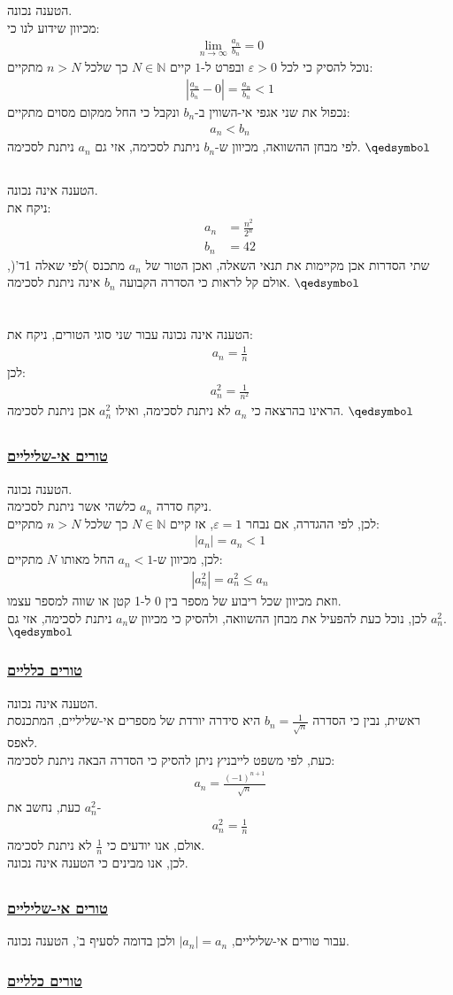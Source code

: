 \documentclass[a4paper, 12pt, leqno]{article}
\newcommand{\sub}[1]{\subsection{\underline{#1}}}
\newcommand{\subsub}[1]{\subsubsection{\underline{#1}}}
\newcommand{\N}{\ensuremath{\mathbb{N}}}
\newcommand{\eq}[1]{\begin{align*}#1\end{align*}}
\newcommand{\limn}{\lim_{n\to\infty}}
\renewcommand{\qed}{\hfill\(\qedsymbol\)}
\renewcommand{\leq}{\leqslant}
\begin{document}
\pagebreak
\section{}
\sub{}
הטענה נכונה.\\
מכיוון שידוע לנו כי:
\eq{
    \limn\frac{a_n}{b_n}=0
}
נוכל להסיק כי לכל $\varepsilon>0$ ובפרט ל-$1$ קיים $N\in\N$ כך שלכל $n>N$ מתקיים:
\eq{
    |\frac{a_n}{b_n}-0|=\frac{a_n}{b_n}<1
}
נכפול את שני אגפי אי-השווין ב-$b_n$ ונקבל כי החל ממקום מסוים מתקיים:
\eq{
    a_n<b_n
}
לפי מבחן ההשוואה, מכיוון ש-$b_n$ ניתנת לסכימה, אזי גם $a_n$ ניתנת לסכימה.
\qed
\sub{}
הטענה אינה נכונה.\\
ניקח את:
\eq{
    a_n&=\frac{n^2}{2^n}\\
    b_n&=42
}
שתי הסדרות אכן מקיימות את תנאי השאלה, ואכן הטור של $a_n$ מתכנס )לפי שאלה 1ד'(, אולם קל לראות כי הסדרה הקבועה $b_n$ אינה ניתנת לסכימה.
\qed\pagebreak

\section{}
\sub{}
הטענה אינה נכונה עבור שני סוגי הטורים, ניקח את:
\eq{
    a_n=\frac{1}{n}
}
לכן:
\eq{
    a^{2}_{n}=\frac{1}{n^2}
}
הראינו בהרצאה כי $a_n$ לא ניתנת לסכימה, ואילו $a^{2}_{n}$ אכן ניתנת לסכימה.
\qed
\sub{}
\subsub{טורים אי-שליליים}
הטענה נכונה.\\
ניקח סדרה $a_n$ כלשהי אשר ניתנת לסכימה.\\
לכן, לפי ההגדרה, אם נבחר $\varepsilon=1$, אז קיים $N\in\N$ כך שלכל $n>N$ מתקיים:
\eq{
    |a_n|=a_n<1
}
לכן, מכיוון ש-$a_n<1$ החל מאותו $N$ מתקיים:
\eq{
    |a^{2}_{n}|=a^{2}_{n}\leq{a_n}
}
וזאת מכיוון שכל ריבוע של מספר בין 0 ל-1 קטן או שווה למספר עצמו.\\
לכן, נוכל כעת להפעיל את מבחן ההשוואה, ולהסיק כי מכיוון ש$a_n$ ניתנת לסכימה, אזי גם $a^{2}_{n}$.
\qed
\subsub{טורים כלליים}
הטענה אינה נכונה.\\
ראשית, נבין כי הסדרה $b_n=\frac{1}{\sqrt{n}}$ היא סידרה יורדת של מספרים אי-שליליים, המתכנסת לאפס.\\
כעת, לפי משפט לייבניץ ניתן להסיק כי הסדרה הבאה ניתנת לסכימה:
\eq{
    a_n=\frac{(-1)^{n+1}}{\sqrt{n}}
}
כעת, נחשב את $a^{2}_{n}$-
\eq{
    a^{2}_{n}=\frac{1}{n}
}
אולם, אנו יודעים כי $\frac{1}{n}$ לא ניתנת לסכימה.\\
לכן, אנו מבינים כי הטענה אינה נכונה.
\sub{}
\subsub{טורים אי-שליליים}
עבור טורים אי-שליליים, $|a_n|=a_n$ ולכן בדומה לסעיף ב', הטענה נכונה.
\subsub{טורים כלליים}

\end{document}
